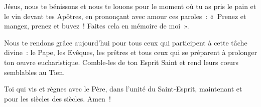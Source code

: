 

Jésus, nous te bénissons et nous te louons pour le moment où tu as pris le pain et le vin devant tes Apôtres, en prononçant avec amour ces paroles : « Prenez et mangez, prenez et buvez ! Faites cela en mémoire de moi ».

Nous te rendons grâce aujourd’hui pour tous ceux qui participent à cette tâche divine : le Pape, les Evêques, les prêtres et tous ceux qui se préparent à prolonger ton œuvre eucharistique. Comble-les de ton Esprit Saint et rend leurs cœurs semblables au Tien.

Toi qui vis et règnes avec le Père, dans l’unité du Saint-Esprit, maintenant et pour les siècles des siècles. Amen !

